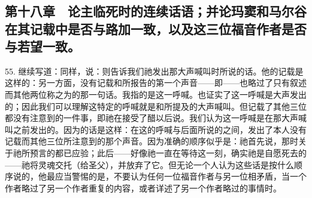 
\section{}


\subsection{第十八章　论主临死时的连续话语；并论玛窦和马尔谷在其记载中是否与路加一致，以及这三位福音作者是否与若望一致。}

55. 继续写道：同样，说：则告诉我们祂发出那大声喊叫时所说的话。他的记载是这样的：另一方面，没有记载和所报告的第一个声音——即——也略过了只有叙述而其他两位称之为的那一句话。我指的是这一呼喊。也证实了这一呼喊是大声发出的；因此我们可以理解这特定的呼喊就是和所提及的大声喊叫。但记载了其他三位都没有注意到的一件事，即祂在接受了醋以后说。我们认为这一呼喊是在那大声喊叫之前发出的。因为的话是这样：在这的呼喊与后面所说的之间，发出了本人没有记载而其他三位所注意到的那个声音。因为准确的顺序似乎是：祂首先说，那时关于祂所预言的都已应验；此后——好像祂一直在等待这一刻，确实祂是自愿死去的——祂将灵魂交托（给圣父），并放弃了它。但无论一个人认为这些话是按什么顺序说的，他最应当警惕的是，不要认为任何一位福音作者与另一位相矛盾，当一个作者略过了另一个作者重复的内容，或者详述了另一个作者略过的事情时。\par



